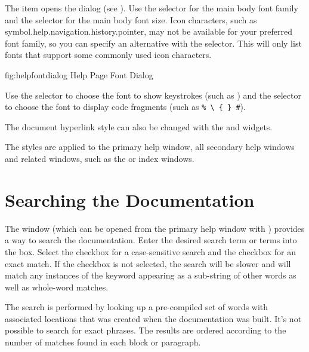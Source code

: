 The  item opens the
 dialog (see
). Use the
 selector for the main body font
family and the  selector for the
main body font size. Icon characters, such as
\gls{symbol.help.navigation.history.pointer}, may not be available
for your preferred font family, so you can specify an alternative
with the  selector. This
will only list fonts that support some commonly used icon
characters.

\FloatFig
{fig:helpfontdialog}
{%
}
{Help Page Font Dialog}

Use the  selector to
choose the font to show keystrokes (such as
) and the
 selector to choose the
font to display code fragments (such as \verb|% \ { } #|).

The document hyperlink style can also be changed with the 
 and
 widgets.

The styles are applied to the primary help window, all secondary
help windows and related windows, such as the  
or index windows.

\section{Searching the Documentation}
\label{sec:helpsearch}

The  window (which can be opened from the
primary help window with ) provides 
a way to search the documentation. Enter the desired search term or terms into the
 box. Select the 
checkbox for a case-sensitive search and the 
checkbox for an exact match. If the 
checkbox is not selected, the search will be slower and will match
any instances of the keyword appearing as a sub-string of other
words as well as whole-word matches.

\begin{information}
The search is performed by looking up a pre-compiled set of words with
associated locations that was created when the documentation was
built. It's not possible to search for exact phrases. The results are
ordered according to the number of matches found in each block or
paragraph.
\end{information}

